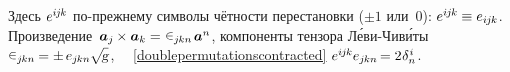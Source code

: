 \begin{otherlanguage}{russian}
\vspace{-0.2em}\noindent
Здесь ${e^{i\hspace{-0.1ex}j\hspace{-0.1ex}k}}$ по\hbox{-}прежнему символы чётности перестановки (${\pm 1}$ или~$0$):
${e^{i\hspace{-0.1ex}j\hspace{-0.1ex}k} \hspace{-0.1ex} \equiv e_{i\hspace{-0.1ex}j\hspace{-0.1ex}k}}$.
Произведение~${\bm{a}_j \hspace{-0.1ex} \times \bm{a}_k = \hspace{.1ex} \permutationsparitysymbols{j\hspace{-0.1ex}kn} \hspace{.2ex} \bm{a}^n\hspace{-0.12ex}}$, компоненты тензора Л\'{е}ви\hbox{-\!}Чив\'{и}ты~${ \permutationsparitysymbols{j\hspace{-0.1ex}kn} \hspace{-0.2ex} = \pm \hspace{.33ex} e_{j\hspace{-0.1ex}kn} \hspace{-0.1ex} \sqrt{\hspace{-0.36ex}\mathstrut{\textsl{g}}} }$,
~~\eqref{doublepermutationscontracted}
${e^{i\hspace{-0.1ex}j\hspace{-0.1ex}k} e_{j\hspace{-0.1ex}kn} \hspace{-0.25ex} = 2 \hspace{.1ex} \delta_n^{\hspace{.1ex}i}}$.


\end{otherlanguage}
